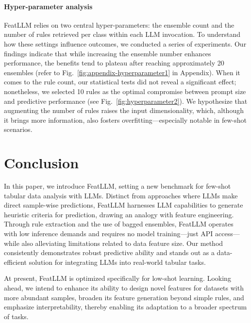\vspace*{-0.12in}
\paragraph{Hyper-parameter analysis}
\textsf{FeatLLM} relies on two central hyper-parameters: the ensemble count and the number of rules retrieved per class within each LLM invocation. To understand how these settings influence outcomes, we conducted a series of experiments. Our findings indicate that while increasing the ensemble number enhances performance, the benefits tend to plateau after reaching approximately 20 ensembles (refer to Fig.~\ref{fig:appendix-hyperparameter1} in Appendix). When it comes to the rule count, our statistical tests did not reveal a significant effect; nonetheless, we selected 10 rules as the optimal compromise between prompt size and predictive performance (see Fig.~\ref{fig:hyperparameter2}). We hypothesize that augmenting the number of rules raises the input dimensionality, which, although it brings more information, also fosters overfitting—especially notable in few-shot scenarios.

\section{Conclusion}
In this paper, we introduce \textsf{FeatLLM}, setting a new benchmark for few-shot tabular data analysis with LLMs. Distinct from approaches where LLMs make direct sample-wise predictions, \textsf{FeatLLM} harnesses LLM capabilities to generate heuristic criteria for prediction, drawing an analogy with feature engineering. Through rule extraction and the use of bagged ensembles, \textsf{FeatLLM} operates with low inference demands and requires no model training—just API access—while also alleviating limitations related to data feature size. Our method consistently demonstrates robust predictive ability and stands out as a data-efficient solution for integrating LLMs into real-world tabular tasks.

At present, \textsf{FeatLLM} is optimized specifically for low-shot learning. Looking ahead, we intend to enhance its ability to design novel features for datasets with more abundant samples, broaden its feature generation beyond simple rules, and emphasize interpretability, thereby enabling its adaptation to a broader spectrum of tasks.

